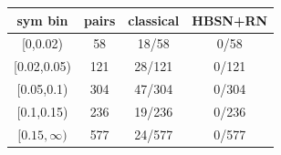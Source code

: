 \begin{tabular}{|c|c|c|c|}\hline
sym bin & pairs & classical & HBSN+RN \\ \hline
[0,0.02) & 58 & 18/58 & 0/58 \\ \hline
[0.02,0.05) & 121 & 28/121 & 0/121 \\ \hline
[0.05,0.1) & 304 & 47/304 & 0/304 \\ \hline
[0.1,0.15) & 236 & 19/236 & 0/236 \\ \hline
$[0.15,\infty)$ & 577 & 24/577 & 0/577 \\ \hline
\end{tabular}
